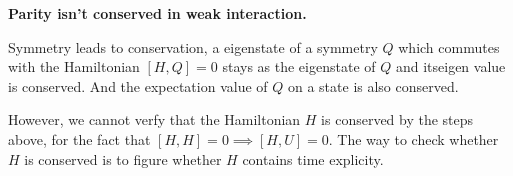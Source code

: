 
\textbf{Parity isn't conserved in weak interaction.}

Symmetry leads to conservation, a eigenstate of a symmetry $Q$ which commutes with the Hamiltonian $[H, Q] = 0$ stays as the eigenstate of $Q$ and itseigen value is conserved.
And the expectation value of $Q$ on a state is also conserved. 


However, we cannot verfy that the Hamiltonian $H$ is conserved by the steps above, for the fact that $[H,H] = 0 \implies [H, U] = 0$. The way to check whether $H$ is conserved is to figure whether $H$ contains time explicity.

